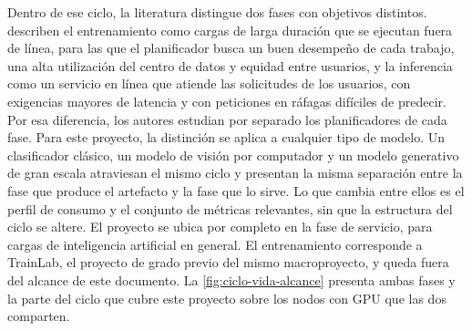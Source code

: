 Dentro de ese ciclo, la literatura distingue dos fases con objetivos distintos. \citet{ye-dlschedulingsurvey-2024} describen el entrenamiento como cargas de larga duración que se ejecutan fuera de línea, para las que el planificador busca un buen desempeño de cada trabajo, una alta utilización del centro de datos y equidad entre usuarios, y la inferencia como un servicio en línea que atiende las solicitudes de los usuarios, con exigencias mayores de latencia y con peticiones en ráfagas difíciles de predecir. Por esa diferencia, los autores estudian por separado los planificadores de cada fase. Para este proyecto, la distinción se aplica a cualquier tipo de modelo. Un clasificador clásico, un modelo de visión por computador y un modelo generativo de gran escala atraviesan el mismo ciclo y presentan la misma separación entre la fase que produce el artefacto y la fase que lo sirve. Lo que cambia entre ellos es el perfil de consumo y el conjunto de métricas relevantes, sin que la estructura del ciclo se altere. El proyecto se ubica por completo en la fase de servicio, para cargas de inteligencia artificial en general. El entrenamiento corresponde a TrainLab, el proyecto de grado previo del mismo macroproyecto, y queda fuera del alcance de este documento. La \cref{fig:ciclo-vida-alcance} presenta ambas fases y la parte del ciclo que cubre este proyecto sobre los nodos con GPU que las dos comparten.

